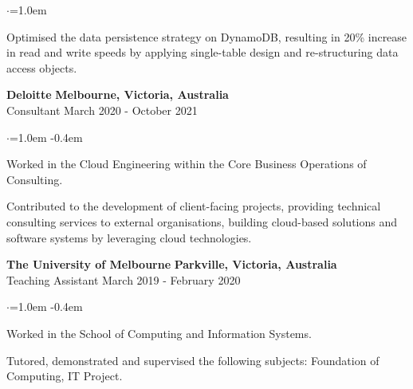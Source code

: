 \documentclass{cv}
\begin{document}
\begin{list}{}{\setlength{\leftmargin}{0em}}
\begin{list}{$\cdot$}{\leftmargin=1.0em}
        \item Optimised the data persistence strategy on DynamoDB, resulting in 20\% increase in read and write speeds by applying single-table design and re-structuring data access objects.
    \end{list}
\item[]
    \textbf{Deloitte} \hfill \textbf{Melbourne, Victoria, Australia}%
    \\ 
    {Consultant} \hfill {March 2020 - October 2021}%
    \begin{list}{$\cdot$}{\leftmargin=1.0em}
    \itemsep -0.4em \vspace{-0.4em}
        \item Worked in the Cloud Engineering within the Core Business Operations of Consulting.
        \item Contributed to the development of client-facing projects, providing technical consulting services to external organisations, building cloud-based solutions and software systems by leveraging cloud technologies.
    \end{list}
\item[]
    \textbf{The University of Melbourne} \hfill \textbf{Parkville, Victoria, Australia}%
    \\ 
    {Teaching Assistant} \hfill {March 2019 - February 2020}%
    \begin{list}{$\cdot$}{\leftmargin=1.0em}
    \itemsep -0.4em \vspace{-0.4em}
        \item Worked in the School of Computing and Information Systems.
        \item Tutored, demonstrated and supervised the following subjects: Foundation of Computing, IT Project.
    \end{list}
\end{list}
\end{document}
